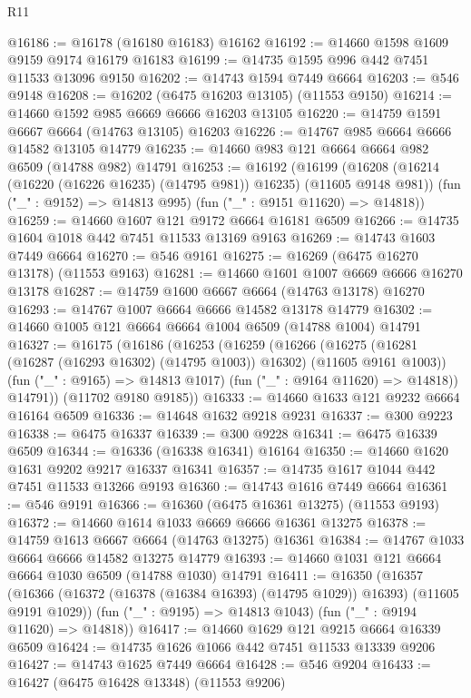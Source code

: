 \begin{lexlean}{R11}
\begin{coremodule}
@16186 := @16178 (@16180 @16183) @16162
@16192 := @14660 @1598 @1609 @9159 @9174 @16179 @16183
@16199 := @14735 @1595 @996 @442 @7451 @11533 @13096 @9150
@16202 := @14743 @1594 @7449 @6664
@16203 := @546 @9148
@16208 := @16202 (@6475 @16203 @13105) (@11553 @9150)
@16214 := @14660 @1592 @985 @6669 @6666 @16203 @13105
@16220 := @14759 @1591 @6667 @6664 (@14763 @13105) @16203
@16226 := @14767 @985 @6664 @6666 @14582 @13105 @14779
@16235 := @14660 @983 @121 @6664 @6664 @982 @6509 (@14788 @982) @14791
@16253 := @16192
    (@16199
      (@16208 (@16214 (@16220 (@16226 @16235) (@14795 @981)) @16235) (@11605 @9148 @981))
      (fun ("_" : @9152) => @14813 @995)
      (fun ("_" : @9151 @11620) => @14818))
@16259 := @14660 @1607 @121 @9172 @6664 @16181 @6509
@16266 := @14735 @1604 @1018 @442 @7451 @11533 @13169 @9163
@16269 := @14743 @1603 @7449 @6664
@16270 := @546 @9161
@16275 := @16269 (@6475 @16270 @13178) (@11553 @9163)
@16281 := @14660 @1601 @1007 @6669 @6666 @16270 @13178
@16287 := @14759 @1600 @6667 @6664 (@14763 @13178) @16270
@16293 := @14767 @1007 @6664 @6666 @14582 @13178 @14779
@16302 := @14660 @1005 @121 @6664 @6664 @1004 @6509 (@14788 @1004) @14791
@16327 := @16175
    (@16186
      (@16253
        (@16259
          (@16266
            (@16275 (@16281 (@16287 (@16293 @16302) (@14795 @1003)) @16302) (@11605 @9161 @1003))
            (fun ("_" : @9165) => @14813 @1017)
            (fun ("_" : @9164 @11620) => @14818))
          @14791))
      (@11702 @9180 @9185))
@16333 := @14660 @1633 @121 @9232 @6664 @16164 @6509
@16336 := @14648 @1632 @9218 @9231
@16337 := @300 @9223
@16338 := @6475 @16337
@16339 := @300 @9228
@16341 := @6475 @16339 @6509
@16344 := @16336 (@16338 @16341) @16164
@16350 := @14660 @1620 @1631 @9202 @9217 @16337 @16341
@16357 := @14735 @1617 @1044 @442 @7451 @11533 @13266 @9193
@16360 := @14743 @1616 @7449 @6664
@16361 := @546 @9191
@16366 := @16360 (@6475 @16361 @13275) (@11553 @9193)
@16372 := @14660 @1614 @1033 @6669 @6666 @16361 @13275
@16378 := @14759 @1613 @6667 @6664 (@14763 @13275) @16361
@16384 := @14767 @1033 @6664 @6666 @14582 @13275 @14779
@16393 := @14660 @1031 @121 @6664 @6664 @1030 @6509 (@14788 @1030) @14791
@16411 := @16350
    (@16357
      (@16366 (@16372 (@16378 (@16384 @16393) (@14795 @1029)) @16393) (@11605 @9191 @1029))
      (fun ("_" : @9195) => @14813 @1043)
      (fun ("_" : @9194 @11620) => @14818))
@16417 := @14660 @1629 @121 @9215 @6664 @16339 @6509
@16424 := @14735 @1626 @1066 @442 @7451 @11533 @13339 @9206
@16427 := @14743 @1625 @7449 @6664
@16428 := @546 @9204
@16433 := @16427 (@6475 @16428 @13348) (@11553 @9206)

\end{coremodule}
\end{lexlean}
